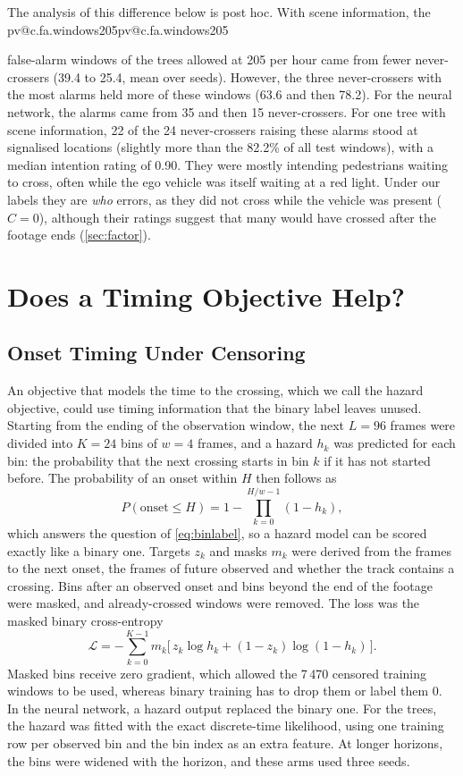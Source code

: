 \documentclass[10pt,a4paper,twocolumn]{article}
\makeatletter
\newcommand{\V}[1]{\ifcsname pv@#1\endcsname\csname pv@#1\endcsname\else
  \PackageError{numbers}{Unknown number key: #1}{Run figures/make_tables.py}\fi}
\makeatother
\begin{document}
The analysis of this difference below is post hoc. With scene information,
the \V{c.fa.windows205} false-alarm windows of the trees allowed at 205 per
hour came from fewer never-crossers (39.4 to 25.4, mean over seeds). However,
the three never-crossers with the most alarms held more of these windows (63.6
and then 78.2). For the neural network, the alarms came from 35 and then 15
never-crossers. For one tree with scene information, 22 of the 24
never-crossers raising these alarms stood at signalised locations (slightly
more than the 82.2\% of all test windows), with a median intention rating of
0.90. They were mostly intending pedestrians waiting to cross, often while the
ego vehicle was itself waiting at a red light. Under our labels they are
\emph{who} errors, as they did not cross while the vehicle was present
($C = 0$), although their ratings suggest that many would have crossed after
the footage ends (\cref{sec:factor}).

\section{Does a Timing Objective Help?}
\label{sec:objective}

\subsection{Onset Timing Under Censoring}
\label{sec:method}
An objective that models the time to the crossing, which we call the hazard
objective, could use timing information that the binary label leaves unused.
Starting from the ending of the observation window, the next $L = 96$ frames
were divided into
$K = 24$ bins of $w = 4$ frames, and a hazard $h_k$ was
predicted for each bin: the probability that the next crossing starts in bin
$k$ if it has not started before. The probability of an onset within $H$ then
follows as
\begin{equation}
  P(\text{onset} \le H) = 1 - \prod_{k=0}^{H/w - 1}\left(1 - h_k\right),
  \label{eq:readout}
\end{equation}
which answers the question of \cref{eq:binlabel}, so a hazard model can be
scored exactly like a binary one. Targets $z_k$ and masks $m_k$ were derived
from the frames to the next onset, the frames of future observed and whether
the track contains a crossing. Bins after an observed onset and bins beyond
the end of the footage were masked, and already-crossed windows were removed.
The loss was the masked binary cross-entropy
\begin{equation}
  \mathcal{L} = -\sum_{k=0}^{K-1} m_k
    \Big[\, z_k \log h_k + (1 - z_k)\log(1 - h_k) \,\Big].
  \label{eq:loss}
\end{equation}
Masked bins receive zero gradient, which allowed the 7\,470 censored
training windows to be used, whereas binary training has to drop them or label
them 0. In the neural network, a hazard
output replaced the binary one. For the trees, the hazard was fitted with the
exact discrete-time likelihood, using one training row per observed bin and
the bin index as an extra feature. At longer horizons, the bins were widened
with the horizon, and these arms used three seeds.
\end{document}
